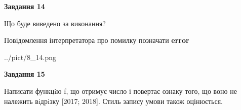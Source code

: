 \documentclass[11pt, ukrainian]{article}
\begin{document}
{\begin {large}
{\begin {center}\textbf{Завдання 14}\end {center}}\par
Що буде виведено за виконання? \par
Повідомлення інтерпретатора про помилку позначати \textbf{error}

\begin{center}
	{../pict/8_14.png}
\end{center}
\newpage

{\begin {center}\textbf{Завдання 15}\end {center}}\par

Написати функцiю f, що отримує число і повертає ознаку того, що воно не належить вiдрiзку [2017; 2018]. Стиль запису умови також оцінюється.\par
\newpage

\end {large}}
\end{document}
